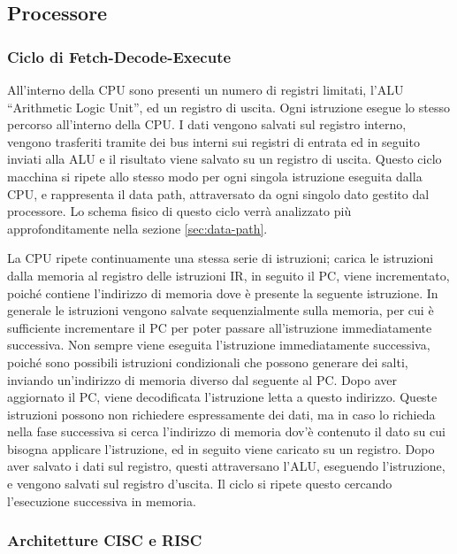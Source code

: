 \documentclass{article}
\numberwithin{equation}{subsection}
\begin{document}
\subsection{Processore}

\subsubsection{Ciclo di Fetch-Decode-Execute}

All'interno della CPU sono presenti un numero di registri limitati, l'ALU ``Arithmetic Logic Unit'', ed un registro di uscita. Ogni istruzione esegue lo stesso percorso all'interno 
della CPU. I dati vengono salvati sul registro interno, vengono trasferiti tramite dei bus interni sui registri di entrata ed in seguito inviati alla ALU e il risultato viene 
salvato su un registro di uscita. Questo ciclo macchina si ripete allo stesso modo per ogni singola istruzione eseguita dalla CPU, e rappresenta il data path, attraversato da ogni singolo dato 
gestito dal processore. Lo schema fisico di questo ciclo verrà analizzato più approfonditamente nella sezione \ref{sec:data-path}. 

La CPU ripete continuamente una stessa serie di istruzioni; carica le istruzioni dalla memoria al registro delle istruzioni IR, in seguito il 
PC, viene incrementato, poiché contiene l'indirizzo di memoria dove è presente la seguente istruzione. In generale le istruzioni vengono salvate 
sequenzialmente sulla memoria, per cui è sufficiente incrementare il PC per poter passare all'istruzione immediatamente successiva. Non sempre viene eseguita l'istruzione 
immediatamente successiva, poiché sono possibili istruzioni condizionali che possono generare dei salti, inviando un'indirizzo di memoria diverso dal seguente al PC. Dopo 
aver aggiornato il PC, viene decodificata l'istruzione letta a questo indirizzo. Queste istruzioni possono non richiedere espressamente dei dati, ma in caso lo 
richieda nella fase successiva si cerca l'indirizzo di memoria dov'è contenuto il dato su cui bisogna applicare l'istruzione, ed in seguito viene caricato su un registro. Dopo 
aver salvato i dati sul registro, questi attraversano l'ALU, eseguendo l'istruzione, e vengono salvati sul registro d'uscita. Il ciclo si ripete questo cercando l'esecuzione successiva in memoria. 

\subsubsection{Architetture CISC e RISC}
\end{document}
